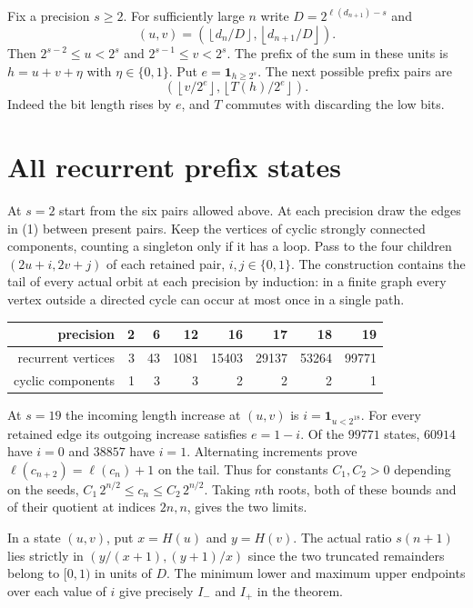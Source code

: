 \documentclass[11pt,letterpaper]{article}
\newcommand{\fl}[1]{\left\lfloor#1\right\rfloor}
\begin{document}
Fix a precision $s\ge2$. For sufficiently large $n$ write $D=2^{\ell(d_{n+1})-s}$ and
\[
 (u,v)=\left(\fl{d_n/D},\fl{d_{n+1}/D}\right).
\]
Then $2^{s-2}\le u<2^s$ and $2^{s-1}\le v<2^s$. The prefix of the sum in these units is $h=u+v+\eta$ with $\eta\in\{0,1\}$. Put $e=\mathbf1_{h\ge2^s}$. The next possible prefix pairs are
\[
        \left(\fl{v/2^e},\fl{T(h)/2^e}\right).                 \tag{1}
\]
Indeed the bit length rises by $e$, and $T$ commutes with discarding the low bits.

\newpage
\section*{All recurrent prefix states}
At $s=2$ start from the six pairs allowed above. At each precision draw the edges in (1) between present pairs. Keep the vertices of cyclic strongly connected components, counting a singleton only if it has a loop. Pass to the four children $(2u+i,2v+j)$ of each retained pair, $i,j\in\{0,1\}$. The construction contains the tail of every actual orbit at each precision by induction: in a finite graph every vertex outside a directed cycle can occur at most once in a single path.
\begin{center}
\begin{tabular}{r|rrrrrrr}
precision & 2&6&12&16&17&18&19\\\midrule
recurrent vertices &3&43&1081&15403&29137&53264&99771\\
cyclic components &1&3&3&2&2&2&1
\end{tabular}
\end{center}
At $s=19$ the incoming length increase at $(u,v)$ is $i=\mathbf1_{u<2^{18}}$. For every retained edge its outgoing increase satisfies $e=1-i$. Of the $99771$ states, $60914$ have $i=0$ and $38857$ have $i=1$. Alternating increments prove $\ell(c_{n+2})=\ell(c_n)+1$ on the tail. Thus for constants $C_1,C_2>0$ depending on the seeds,
$C_1\,2^{n/2}\le c_n\le C_2\,2^{n/2}$. Taking $n$th roots, both of these bounds and of their quotient at indices $2n,n$, gives the two limits.

In a state $(u,v)$, put $x=H(u)$ and $y=H(v)$. The actual ratio $s(n+1)$ lies strictly in $(y/(x+1),(y+1)/x)$ since the two truncated remainders belong to $[0,1)$ in units of $D$. The minimum lower and maximum upper endpoints over each value of $i$ give precisely $I_-$ and $I_+$ in the theorem.
\end{document}
